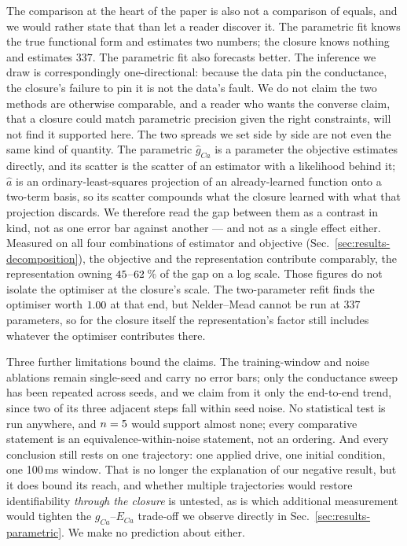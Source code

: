 \documentclass{article}
\newcommand{\Tfull}{100}       %
\newcommand{\NparamUde}{337}   %
\begin{document}
The comparison at the heart of the paper is also not a comparison of equals, and
we would rather state that than let a reader discover it. The parametric fit
knows the true functional form and estimates two numbers; the closure knows
nothing and estimates $\NparamUde$. The parametric fit also forecasts better.
The inference we draw is correspondingly one-directional: because the data pin
the conductance, the closure's failure to pin it is not the data's fault. We do
not claim the two
methods are otherwise comparable, and a reader who wants the converse claim,
that a closure could match parametric precision given the right constraints, will
not find it supported here. The two spreads we set side by side are not even the
same kind of quantity. The parametric $\hat g_{Ca}$ is a parameter the objective
estimates directly, and its scatter is the scatter of an estimator with a
likelihood behind it; $\hat a$ is an ordinary-least-squares projection of an
already-learned function onto a two-term basis, so its scatter compounds what the
closure learned with what that projection discards. We therefore read the gap
between them as a contrast in kind, not as one error bar against another --- and
not as a single effect either. Measured on all four combinations of estimator and
objective (Sec.~\ref{sec:results-decomposition}), the objective and the
representation contribute comparably, the representation owning
$45$--$62$\,\% of the gap on a log scale. Those
figures do not isolate the optimiser at the closure's scale. The two-parameter
refit finds the optimiser worth $1.00$ at that end, but Nelder--Mead cannot
be run at $\NparamUde$ parameters, so for the closure itself the representation's
factor still includes whatever the optimiser contributes there.

Three further limitations bound the claims. The training-window and noise
ablations remain single-seed and carry no error bars; only the conductance sweep
has been repeated
across seeds, and we claim from it only the end-to-end trend, since two of its
three adjacent steps fall within seed noise. No statistical test is run anywhere,
and $n=5$ would support almost none; every comparative
statement is an equivalence-within-noise statement, not an ordering. And every
conclusion still rests on one trajectory: one applied drive, one initial
condition, one \Tfull\,ms window. That is no longer the explanation of our
negative result, but it does bound its reach, and whether multiple trajectories
would restore identifiability \emph{through the closure} is untested, as is
which additional measurement would tighten the $g_{Ca}$--$E_{Ca}$ trade-off we
observe directly in Sec.~\ref{sec:results-parametric}. We make no prediction
about either.
\end{document}
